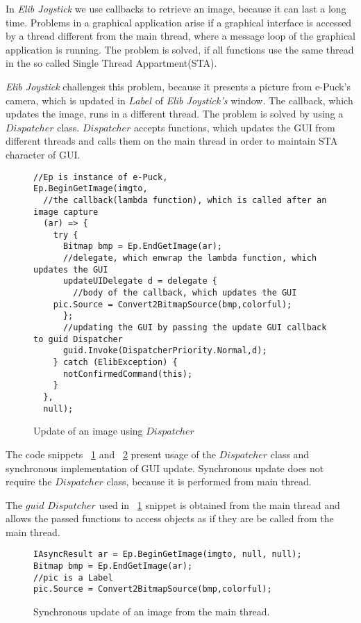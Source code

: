 	In {\it Elib Joystick} we use callbacks to retrieve an image, because it can last a long time.
	Problems in a graphical application arise if a graphical interface is accessed by a thread different from
	the main thread, where a message loop of the graphical application is running. The problem is solved,
	if all functions use the same thread in the so called Single Thread Appartment(STA).

	{\it Elib Joystick} challenges this problem, because it presents a picture from e-Puck's camera, which is updated
	in $Label$ of {\it Elib Joystick's} window. The callback, which updates the image, runs in a different thread.
	The problem is solved by using a $Dispatcher$ class. $Dispatcher$ accepts functions, which updates
	the GUI from different threads and calls them on the main thread in order to maintain STA character
	of GUI. 

\begin{figure}[!hbp]
\begin{lstlisting}
//Ep is instance of e-Puck,
Ep.BeginGetImage(imgto,
  //the callback(lambda function), which is called after an image capture
  (ar) => {
    try {
      Bitmap bmp = Ep.EndGetImage(ar);
      //delegate, which enwrap the lambda function, which updates the GUI
      updateUIDelegate d = delegate {
      	//body of the callback, which updates the GUI
	pic.Source = Convert2BitmapSource(bmp,colorful);
      };
      //updating the GUI by passing the update GUI callback to guid Dispatcher
      guid.Invoke(DispatcherPriority.Normal,d);
    } catch (ElibException) {
      notConfirmedCommand(this);
    }
  }, 
  null);
\end{lstlisting}
\caption{Update of an image using $Dispatcher$}
\label{updispatcher}
\end{figure}


	The code snippets ~\ref{updispatcher} and ~\ref{upsynchronous} present usage of the $Dispatcher$ class and 
	synchronous implementation of GUI update. Synchronous update does not require the $Dispatcher$ class,
	because it is performed from main thread.

	The $guid$ $Dispatcher$ used in ~\ref{updispatcher} snippet is obtained from the main thread and
	allows the passed functions to access objects as if they are be called from the main thread.

\begin{figure}[!hbp]
\begin{lstlisting}
IAsyncResult ar = Ep.BeginGetImage(imgto, null, null);
Bitmap bmp = Ep.EndGetImage(ar);
//pic is a Label
pic.Source = Convert2BitmapSource(bmp,colorful);
\end{lstlisting}
\caption{Synchronous update of an image from the main thread.}
\label{upsynchronous}
\end{figure}

